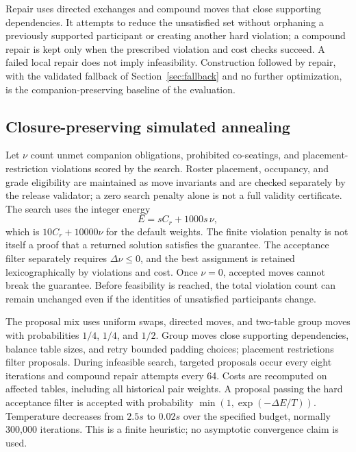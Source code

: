 \documentclass[11pt,a4paper]{article}
\theoremstyle{definition}\newtheorem{definition}[theorem]{Definition}
\theoremstyle{remark}\newtheorem{remark}[theorem]{Remark}
\begin{document}
Repair uses directed exchanges and compound moves that close supporting dependencies. It attempts to reduce the unsatisfied set without orphaning a previously supported participant or creating another hard violation; a compound repair is kept only when the prescribed violation and cost checks succeed. A failed local repair does not imply infeasibility. Construction followed by repair, with the validated fallback of Section~\ref{sec:fallback} and no further optimization, is the companion-preserving baseline of the evaluation.

\subsection{Closure-preserving simulated annealing}
Let $\nu$ count unmet companion obligations, prohibited co-seatings, and placement-restriction violations scored by the search. Roster placement, occupancy, and grade eligibility are maintained as move invariants and are checked separately by the release validator; a zero search penalty alone is not a full validity certificate. The search uses the integer energy
\begin{equation}
 E=sC_r+1000s\,\nu,
\end{equation}
which is $10C_r+10000\nu$ for the default weights. The finite violation penalty is not itself a proof that a returned solution satisfies the guarantee. The acceptance filter separately requires $\Delta\nu\le0$, and the best assignment is retained lexicographically by violations and cost. Once $\nu=0$, accepted moves cannot break the guarantee. Before feasibility is reached, the total violation count can remain unchanged even if the identities of unsatisfied participants change.

The proposal mix uses uniform swaps, directed moves, and two-table group moves with probabilities $1/4$, $1/4$, and $1/2$. Group moves close supporting dependencies, balance table sizes, and retry bounded padding choices; placement restrictions filter proposals. During infeasible search, targeted proposals occur every eight iterations and compound repair attempts every 64. Costs are recomputed on affected tables, including all historical pair weights. A proposal passing the hard acceptance filter is accepted with probability $\min(1,\exp(-\Delta E/T))$. Temperature decreases from $2.5s$ to $0.02s$ over the specified budget, normally 300,000 iterations. This is a finite heuristic; no asymptotic convergence claim is used.
\end{document}
